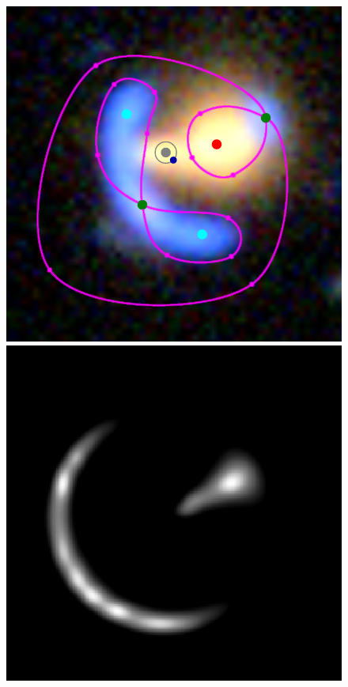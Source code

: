 \documentclass[usenatbib]{mn2e}
\newlength{\myplotswidth}
\begin{document}
\begin{figure}
  \centering
  
  \includegraphics[width=\myplotswidth]{fig/006990_input}
  \includegraphics[width=\myplotswidth]{fig/006990_arr_time_ipol} \\

\end{figure}
\end{document}

